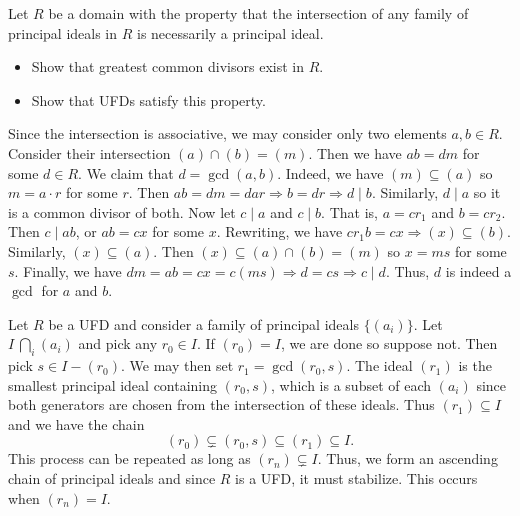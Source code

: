 \documentclass[../../master.tex]{subfiles}
\begin{document}
    \begin{problem}
        Let $R$ be a domain with the property that the intersection of any
        family of principal ideals in $R$ is necessarily a principal ideal.
        \begin{itemize}
            \item Show that greatest common divisors exist in $R$.
            \item Show that UFDs satisfy this property.
        \end{itemize}
    \end{problem}

    \begin{solution}
        Since the intersection is associative, we may consider only two elements
        $a, b \in R$. Consider their intersection $(a) \cap (b) = (m)$. Then we
        have $ab = dm$ for some $d \in R$. We claim that $d = \gcd(a, b)$.
        Indeed, we have $(m) \subseteq (a)$ so $m = a \cdot r$ for some $r$.
        Then $ab = dm = d a r \Longrightarrow b = dr \Longrightarrow d \mid b$.
        Similarly, $d \mid a$ so it is a common divisor of both. Now let $c \mid
        a$ and $c \mid b$. That is, $a = c r_1$ and $b = c r_2$. Then $c \mid
        ab$, or $ab = cx$ for some $x$. Rewriting, we have $c r_1 b = cx
        \Longrightarrow (x) \subseteq (b)$. Similarly, $(x) \subseteq (a)$. Then
        $(x) \subseteq (a) \cap (b) = (m)$ so $x = m s$ for some $s$. Finally,
        we have $dm = ab = cx = c (ms) \Longrightarrow d = cs \Longrightarrow c
        \mid d$. Thus, $d$ is indeed a $\gcd$ for $a$ and $b$.

        Let $R$ be a UFD and consider a family of principal ideals $\{ (a_i)
        \}$. Let $I \ \bigcap_i (a_i)$ and pick any $r_0 \in I$. If $(r_0) = I$,
        we are done so suppose not. Then pick $s \in I - (r_0)$. We may then set
        $r_1 = \gcd(r_0, s)$. The ideal $(r_1)$ is the smallest principal ideal
        containing $(r_0, s)$, which is a subset of each $(a_i)$ since both
        generators are chosen from the intersection of these ideals. Thus $(r_1)
        \subseteq I$ and we have the chain 
        \[
            (r_0) \subsetneq (r_0, s) \subseteq (r_1) \subseteq I.
        \] 
        This process can be repeated as long as $(r_n) \subsetneq I$. Thus, we
        form an ascending chain of principal ideals and since $R$ is a UFD, it
        must stabilize. This occurs when $(r_n) = I$.
    \end{solution}
\end{document}
